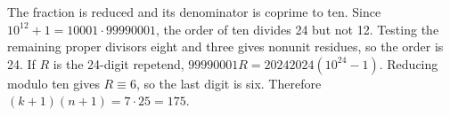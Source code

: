 The fraction is reduced and its denominator is coprime to ten. Since $10^{12}+1=10001\cdot99990001$, the order of ten divides 24 but not 12. Testing the remaining proper divisors eight and three gives nonunit residues, so the order is 24. If $R$ is the 24-digit repetend, $99990001R=20242024(10^{24}-1)$. Reducing modulo ten gives $R\equiv6$, so the last digit is six. Therefore $(k+1)(n+1)=7\cdot25=\boxed{175}$.
